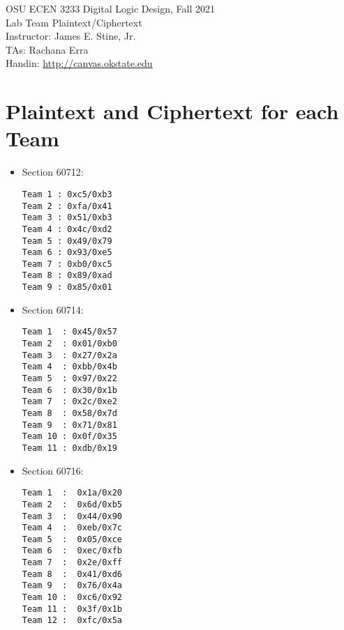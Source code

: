\documentclass{article}
\newcommand{\mycourse}{\textsc OSU ECEN 3233 Digital Logic Design, Fall 2021}
\newcommand{\myassignment}{\textsc Lab Team Plaintext/Ciphertext}
\newcommand{\myinstructor}{Instructor: James E. Stine, Jr.}
\newcommand{\mytas}{TAs: Rachana Erra}
\newcommand{\myhandin}{Handin: \url{http://canvas.okstate.edu}}
\begin{document}
\begin{center}
  {\large \mycourse} \\
  \vspace{0.1in}
  {\large \myassignment} \\
  \vspace{0.25in} 
  \myinstructor \\
  \mytas \\
  \vspace{0.25in} 
  \myhandin \\
\end{center}

\vspace{0.25in}
\noindent

\section{Plaintext and Ciphertext for each Team}

{\footnotesize
\begin{itemize}
\item Section 60712:  
\begin{verbatim}
Team 1 : 0xc5/0xb3  
Team 2 : 0xfa/0x41
Team 3 : 0x51/0xb3
Team 4 : 0x4c/0xd2
Team 5 : 0x49/0x79
Team 6 : 0x93/0xe5
Team 7 : 0xb0/0xc5
Team 8 : 0x89/0xad
Team 9 : 0x85/0x01
\end{verbatim}
\item Section 60714: 
\begin{verbatim}
Team 1  : 0x45/0x57
Team 2  : 0x01/0xb0
Team 3  : 0x27/0x2a
Team 4  : 0xbb/0x4b
Team 5  : 0x97/0x22
Team 6  : 0x30/0x1b
Team 7  : 0x2c/0xe2
Team 8  : 0x58/0x7d
Team 9  : 0x71/0x81
Team 10 : 0x0f/0x35
Team 11 : 0xdb/0x19
\end{verbatim}

\item Section 60716: 
\begin{verbatim}
Team 1  :  0x1a/0x20
Team 2  :  0x6d/0xb5
Team 3  :  0x44/0x90
Team 4  :  0xeb/0x7c
Team 5  :  0x05/0xce
Team 6  :  0xec/0xfb
Team 7  :  0x2e/0xff
Team 8  :  0x41/0xd6
Team 9  :  0x76/0x4a
Team 10 :  0xc6/0x92
Team 11 :  0x3f/0x1b
Team 12 :  0xfc/0x5a
\end{verbatim}

\end{itemize}
}




\end{document}
